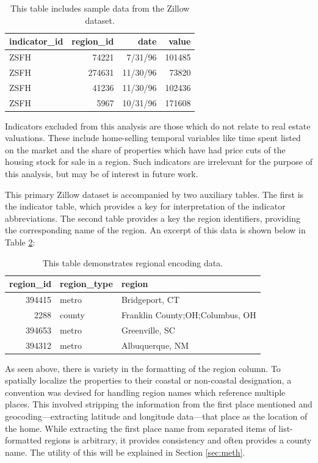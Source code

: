 \documentclass[12pt]{article}
\begin{document}
\begin{table}[h]
  \caption{This table includes sample data from the Zillow dataset.}
  \label{tab:zillowmain}
\centering
\begin{tabular}{lrrr}
  \toprule
  indicator\_id & region\_id & date & value \\
  \midrule
  ZSFH & 74221 & 7/31/96 & 101485 \\
  ZSFH & 274631 & 11/30/96 & 73820 \\
  ZSFH & 41236 & 11/30/96 & 102436 \\
  ZSFH & 5967 & 10/31/96 & 171608 \\
  \bottomrule
\end{tabular}
\end{table}

Indicators excluded from this analysis are those which do not relate to real estate valuations. These include home-selling temporal variables like time spent listed on the market and the share of properties which have had price cuts of the housing stock for sale in a region. Such indicators are irrelevant for the purpose of this analysis, but may be of interest in future work.

This primary Zillow dataset is accompanied by two auxiliary tables. The first is the indicator table, which provides a key for interpretation of the indicator abbreviations. The second table provides a key the region identifiers, providing the corresponding name of the region. An excerpt of this data is shown below in Table \ref{tab:region_data}:

\begin{table}[h]
  \caption{This table demonstrates regional encoding data.}
  \label{tab:region_data}
\centering
\begin{tabular}{rll}
  \toprule
  region\_id & region\_type & region \\
  \midrule
  394415 & metro & Bridgeport, CT \\
  2288 & county & Franklin County;OH;Columbus, OH \\
  394653 & metro & Greenville, SC \\
  394312 & metro & Albuquerque, NM \\
  \bottomrule
\end{tabular}
\end{table}

As seen above, there is variety in the formatting of the region column. To spatially localize the properties to their coastal or non-coastal designation, a convention was devised for handling region names which reference multiple places. This involved stripping the information from the first place mentioned and geocoding---extracting latitude and longitude data---that place as the location of the home. While extracting the first place name from separated items of list-formatted regions is arbitrary, it provides consistency and often provides a county name. The utility of this will be explained in Section \ref{sec:meth}.
\end{document}
